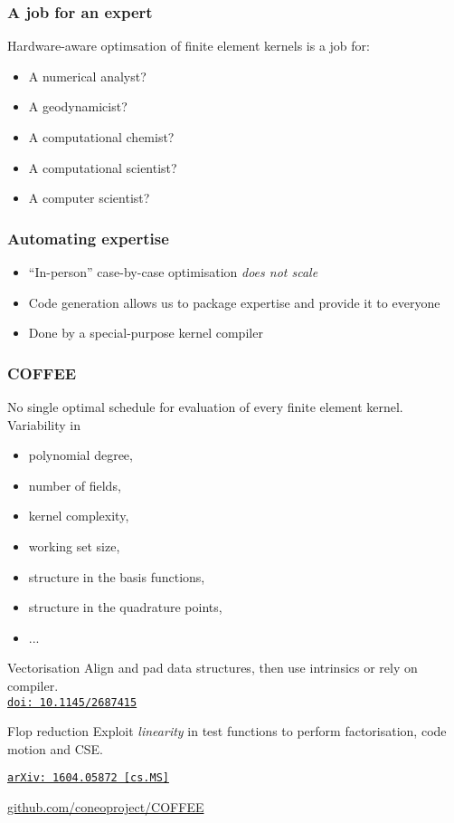 \documentclass[presentation]{beamer}
\newcommand{\arxivlink}[2]{%
  \href{http://www.arxiv.org/abs/#1}%
  {{\small\texttt{arXiv:\,#1\,[#2]}}}%
}
\newcommand{\doilink}[1]{%
  \href{http://dx.doi.org/#1}%
  {{\small\texttt{doi:\,#1}{}}}%
}
\begin{document}
\begin{frame}
  \frametitle{A job for an expert}
  
  Hardware-aware optimsation of finite element kernels is a job for:
  \begin{itemize}
  \item<2-> A numerical analyst?
  \item<3-> A geodynamicist?
  \item<4-> A computational chemist?
  \item<5-> A computational scientist?
  \item<6-> A computer scientist?
  \end{itemize}
\end{frame}

\begin{frame}
  \frametitle{Automating expertise}
  \begin{itemize}
  \item ``In-person'' case-by-case optimisation \emph{does not scale}
  \item Code generation allows us to package expertise and provide it
    to everyone
  \item Done by a special-purpose kernel compiler
  \end{itemize}
\end{frame}

\begin{frame}[allowframebreaks]
  \frametitle{COFFEE}

  No single optimal schedule for evaluation of every finite element
  kernel.  Variability in
  \begin{itemize}
  \item polynomial degree,
  \item number of fields,
  \item kernel complexity,
  \item working set size,
  \item structure in the basis functions,
  \item structure in the quadrature points,
  \item ...
  \end{itemize}

\pagebreak

\begin{block}{Vectorisation}
  Align and pad data structures, then use intrinsics or rely on
  compiler.\\
  \cite{Luporini:2015} \doilink{10.1145/2687415}
\end{block}

\begin{block}{Flop reduction}
  Exploit \emph{linearity} in test functions to perform factorisation,
  code motion and CSE.  

  \cite{Luporini:2016} \arxivlink{1604.05872}{cs.MS}
\end{block}

\begin{center}
  \url{github.com/coneoproject/COFFEE}
\end{center}
\end{frame}
\end{document}
